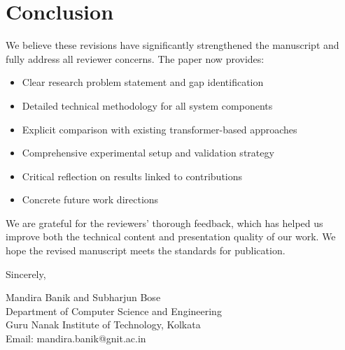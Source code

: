 \documentclass[11pt,a4paper]{article}
\begin{document}
\vspace{12pt}

\section*{Conclusion}

We believe these revisions have significantly strengthened the manuscript and fully address all reviewer concerns. The paper now provides:

\begin{itemize}[leftmargin=*]
    \item Clear research problem statement and gap identification
    \item Detailed technical methodology for all system components
    \item Explicit comparison with existing transformer-based approaches
    \item Comprehensive experimental setup and validation strategy
    \item Critical reflection on results linked to contributions
    \item Concrete future work directions
\end{itemize}

We are grateful for the reviewers' thorough feedback, which has helped us improve both the technical content and presentation quality of our work. We hope the revised manuscript meets the standards for publication.

\vspace{12pt}

\noindent Sincerely,

\vspace{12pt}

\noindent Mandira Banik and Subharjun Bose\\
Department of Computer Science and Engineering\\
Guru Nanak Institute of Technology, Kolkata\\
Email: mandira.banik@gnit.ac.in
\end{document}
